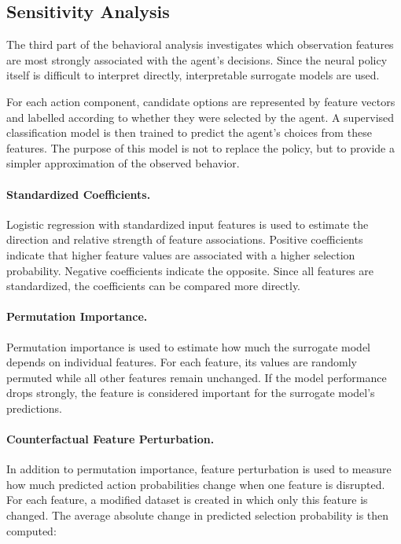 \documentclass[english,bachelor]{hsluthesis}
\begin{document}
\subsection{Sensitivity Analysis}

The third part of the behavioral analysis investigates which observation features are most strongly associated with the agent's decisions. Since the neural policy itself is difficult to interpret directly, interpretable surrogate models are used.

For each action component, candidate options are represented by feature vectors and labelled according to whether they were selected by the agent. A supervised classification model is then trained to predict the agent's choices from these features. The purpose of this model is not to replace the policy, but to provide a simpler approximation of the observed behavior.

\paragraph{Standardized Coefficients.}
Logistic regression with standardized input features is used to estimate the direction and relative strength of feature associations. Positive coefficients indicate that higher feature values are associated with a higher selection probability. Negative coefficients indicate the opposite. Since all features are standardized, the coefficients can be compared more directly.

\paragraph{Permutation Importance.}
Permutation importance is used to estimate how much the surrogate model depends on individual features. For each feature, its values are randomly permuted while all other features remain unchanged. If the model performance drops strongly, the feature is considered important for the surrogate model's predictions.

\paragraph{Counterfactual Feature Perturbation.}
In addition to permutation importance, feature perturbation is used to measure how much predicted action probabilities change when one feature is disrupted. For each feature, a modified dataset is created in which only this feature is changed. The average absolute change in predicted selection probability is then computed:
\end{document}
